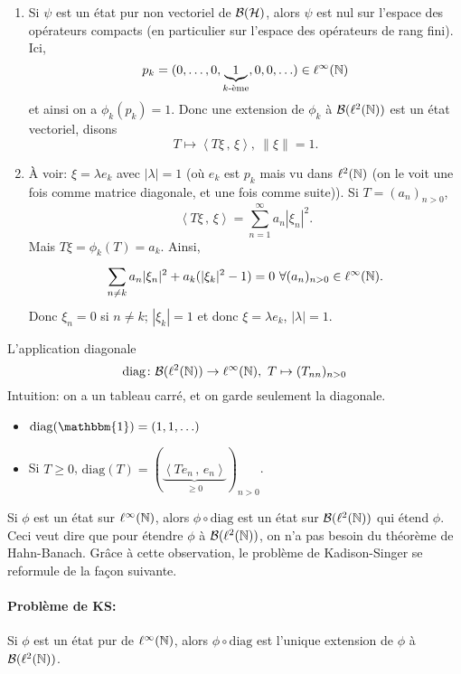 \begin{preuve}
  \begin{enumerate}
  \item Si $\psi$ est un état pur non vectoriel de $\mathcal{B}(\mathcal{H})$, alors $\psi$ est nul sur l'espace des opérateurs
    compacts (en particulier sur l'espace des opérateurs de rang fini). Ici, 
    \[ p_k = (0, \ldots, 0, \underbrace{1}_{k\text{-ème}}, 0, 0, \ldots) \in \ell^\infty(\mathbb{N}) \]
    et ainsi on a $\phi_k(p_k) = 1$. Donc une extension de $\phi_k$ à $\mathcal{B}(\ell^2(\mathbb{N}))$ est un état vectoriel,
    disons 
    \[ T \mapsto \left \langle T \xi\, ,\, \xi \right \rangle ,\ \|\xi\| = 1. \]
    
  \item À voir: $\xi = \lambda e_k$ avec $|\lambda| = 1$ (où $e_k$ est $p_k$ mais vu dans $\ell^2(\mathbb{N})$ (on le
    voit une fois comme matrice diagonale, et une fois comme suite)). Si $T = (a_n)_{n > 0}$, 
    \[ \left \langle T \xi\, ,\, \xi \right \rangle = \sum_{n = 1}^{\infty} a_n |\xi_n|^2. \]
    Mais $T \xi = \phi_k(T) = a_k$. Ainsi, 
    \[ \sum_{n\neq k}^{}a_n |\xi_n|^2 + a_k(|\xi_k|^2 - 1) = 0\ \forall (a_n)_{n > 0} \in \ell^\infty(\mathbb{N}). \]
    Donc $\xi_n = 0$ si $n \neq k$; $|\xi_k| = 1$ et donc $\xi = \lambda e_k$, $|\lambda| = 1$.
  \end{enumerate}
\end{preuve}

\begin{defi}
  L'application diagonale 
  \[ \mathrm{diag} \colon \mathcal{B}(\ell^2(\mathbb{N})) \to \ell^\infty(\mathbb{N}),\ T \mapsto (T_{nn})_{n > 0} \]
  Intuition: on a un tableau carré, et on garde seulement la diagonale.
\end{defi}

\begin{exs}
  \begin{itemize}
    
  \item $\mathrm{diag}(\mathbbm{1}) = (1, 1, \ldots)$
  \item Si $T \geq 0$, $\mathrm{diag}(T) = \left( \underbrace{\left \langle Te_n\, ,\, e_n \right
        \rangle}_{\geq 0}  \right)_{n > 0}$.
  \end{itemize}
\end{exs}

Si $\phi$ est un état sur $\ell^\infty(\mathbb{N})$, alors $\phi \circ \mathrm{diag}$ est un état sur $\mathcal{B}(\ell^2(\mathbb{N}))$
qui étend $\phi$. Ceci veut dire que pour étendre $\phi$ à $\mathcal{B}(\ell^2(\mathbb{N}))$, on n'a pas besoin du théorème de
Hahn-Banach. Grâce à cette observation, le problème de Kadison-Singer se reformule de la façon suivante.

\paragraph{Problème de KS:} Si $\phi$ est un état pur de $\ell^\infty(\mathbb{N})$, alors $\phi \circ \mathrm{diag}$
est l'unique extension de $\phi$ à $\mathcal{B}(\ell^2(\mathbb{N}))$.





